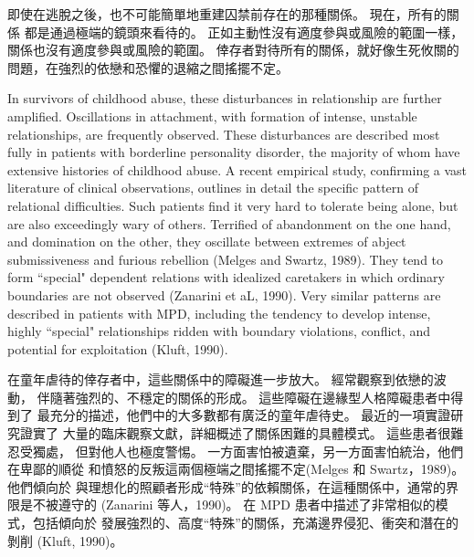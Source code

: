 \documentclass[12pt]{article}
\begin{document}
    即使在逃脫之後，也不可能簡單地重建囚禁前存在的那種關係。 現在，所有的關係
    都是通過極端的鏡頭來看待的。 正如主動性沒有適度參與或風險的範圍一樣，
    關係也沒有適度參與或風險的範圍。 倖存者對待所有的關係，就好像生死攸關的
    問題，在強烈的依戀和恐懼的退縮之間搖擺不定。

    In survivors of childhood abuse, these disturbances in relationship are
    further amplified. Oscillations in attachment, with formation of intense,
    unstable relationships, are frequently observed. These disturbances are
    described most fully in patients with borderline personality disorder, the
    majority of whom have extensive histories of childhood abuse. A recent
    empirical study, confirming a vast literature of clinical observations,
    outlines in detail the specific pattern of relational difficulties. Such
    patients find it very hard to tolerate being alone, but are also
    exceedingly wary of others. Terrified of abandonment on the one hand, and
    domination on the other, they oscillate between extremes of abject
    submissiveness and furious rebellion (Melges and Swartz, 1989). They tend
    to form ``special" dependent relations with idealized caretakers in which
    ordinary boundaries are not observed (Zanarini et aL, 1990). Very similar
    patterns are described in patients with MPD, including the tendency to
    develop intense, highly ``special" relationships ridden with boundary
    violations, conflict, and potential for exploitation (Kluft, 1990).

    在童年虐待的倖存者中，這些關係中的障礙進一步放大。 經常觀察到依戀的波動，
    伴隨著強烈的、不穩定的關係的形成。 這些障礙在邊緣型人格障礙患者中得到了
    最充分的描述，他們中的大多數都有廣泛的童年虐待史。 最近的一項實證研究證實了
    大量的臨床觀察文獻，詳細概述了關係困難的具體模式。 這些患者很難忍受獨處，
    但對他人也極度警惕。 一方面害怕被遺棄，另一方面害怕統治，他們在卑鄙的順從
    和憤怒的反叛這兩個極端之間搖擺不定(Melges 和 Swartz，1989)。 他們傾向於
    與理想化的照顧者形成“特殊”的依賴關係，在這種關係中，通常的界限是不被遵守的
    (Zanarini 等人，1990)。 在 MPD 患者中描述了非常相似的模式，包括傾向於
    發展強烈的、高度“特殊”的關係，充滿邊界侵犯、衝突和潛在的剝削 (Kluft,
    1990)。
\end{document}
